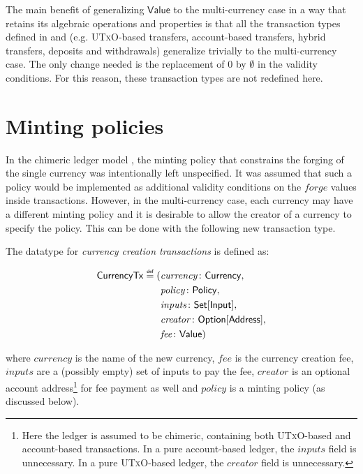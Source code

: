 \documentclass{llncs}
\newcommand{\defeq}{\mathrel{\overset{\makebox[0pt]{\mbox{\normalfont\tiny\sffamily def}}}{=}}}
\newcommand{\utxo}{\textsc{UTxO}\xspace}
\newcommand{\type}[1]{\mathsf{#1}}
\newcommand{\setT}{\type{Set}}
\newcommand{\maybeT}{\type{Option}}
\newcommand{\currencyCreationT}{\type{CurrencyTx}}
\newcommand{\inputT}{\type{Input}}
\newcommand{\addressT}{\type{Address}}
\newcommand{\valueT}{\type{Value}}
\newcommand{\currencyT}{\type{Currency}}
\newcommand{\policyT}{\type{Policy}}
\newcommand{\field}[1]{\mathit{#1}}
\newcommand{\ins}{\field{inputs}}
\newcommand{\forge}{\field{forge}}
\newcommand{\fee}{\field{fee}}
\newcommand{\policy}{\field{policy}}
\newcommand{\creator}{\field{creator}}
\newcommand{\currency}{\field{currency}}
\newenvironment{smallish}{
	\begin{small}
}{
	\end{small}
}
\begin{document}
The main benefit of generalizing $\valueT$ to the multi-currency case in a way that retains its algebraic operations and properties is that all the transaction types defined in \cite{ChimericLedgers} and \cite{UTxOScripts} (e.g. \utxo-based transfers, account-based transfers, hybrid transfers, deposits and withdrawals) generalize trivially to the multi-currency case. The only change needed is the replacement of $0$ by $\emptyset$ in the validity conditions. For this reason, these transaction types are not redefined here. 



\section{Minting policies}
\label{sec:MintingPolicy}

In the chimeric ledger model \cite{ChimericLedgers}, the minting policy that constrains the forging of the single currency was intentionally left unspecified. It was assumed that such a policy would be implemented as additional validity conditions on the $\forge$ values inside transactions. 
However, in the multi-currency case, each currency may have a different minting policy and it is desirable to allow the creator of a currency to specify the policy. This can be done with the following new transaction type.

\begin{definition}
\label{def:CurrencyCreation}
The datatype for \emph{currency creation transactions} is defined as:
\begin{smallish}
\begin{equation*}
\begin{split}
\currencyCreationT \defeq (&\currency\colon \currencyT,\\& \policy\colon \policyT,\\& \ins\colon \setT[\inputT],\\& \creator\colon \maybeT[\addressT],\\& \fee\colon \valueT)
\end{split}
\end{equation*}
\end{smallish}
where $\currency$ is the name of the new currency, $\fee$ is the currency creation fee, $\ins$ are a (possibly empty) set of inputs to pay the fee, $\creator$ is an optional account address\footnote{Here the ledger is assumed to be chimeric, containing both \utxo-based and account-based transactions. In a pure account-based ledger, the $\ins$ field is unnecessary. In a pure \utxo-based ledger, the $\creator$ field is unnecessary.} for fee payment as well and $\policy$ is a minting policy (as discussed below).
\end{definition}
\end{document}
